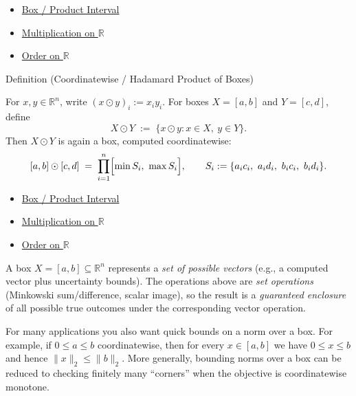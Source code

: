 \begin{dependencies}
\begin{itemize}
  \item \hyperref[def:box]{Box / Product Interval}
  \item \hyperref[def:multiplication-on-r]{Multiplication on $\mathbb{R}$}
  \item \hyperref[def:order-on-r]{Order on $\mathbb{R}$}
\end{itemize}
\end{dependencies}

\begin{definitionbox}{Definition (Coordinatewise / Hadamard Product of Boxes)}
\begin{definition}\label{def:box-hadamard}
For $x,y\in\mathbb{R}^n$, write $(x\odot y)_i := x_i y_i$.
For boxes $X=[a,b]$ and $Y=[c,d]$, define
\[
X\odot Y \;:=\; \{x\odot y : x\in X,\ y\in Y\}.
\]
Then $X\odot Y$ is again a box, computed coordinatewise:
\[
[a,b]\odot[c,d] \;=\; \prod_{i=1}^n \Bigl[\min S_i,\ \max S_i\Bigr],
\qquad
S_i:=\{a_ic_i,\ a_id_i,\ b_ic_i,\ b_id_i\}.
\]
\end{definition}
\end{definitionbox}

\begin{dependencies}
\begin{itemize}
  \item \hyperref[def:box]{Box / Product Interval}
  \item \hyperref[def:multiplication-on-r]{Multiplication on $\mathbb{R}$}
  \item \hyperref[def:order-on-r]{Order on $\mathbb{R}$}
\end{itemize}
\end{dependencies}

\begin{remark*}
A box $X=[a,b]\subseteq\mathbb{R}^n$ represents a \emph{set of possible vectors}
(e.g., a computed vector plus uncertainty bounds). The operations above are
\emph{set operations} (Minkowski sum/difference, scalar image), so the result is a
\emph{guaranteed enclosure} of all possible true outcomes under the corresponding
vector operation.
\end{remark*}

\begin{remark*}
For many applications you also want quick bounds on a norm over a box.
For example, if $0\le a\le b$ coordinatewise, then for every $x\in[a,b]$ we have
$0\le x\le b$ and hence $\|x\|_2\le \|b\|_2$. More generally, bounding norms over
a box can be reduced to checking finitely many ``corners'' when the objective is
coordinatewise monotone.
\label{rem:norm-bounds}
\end{remark*}

